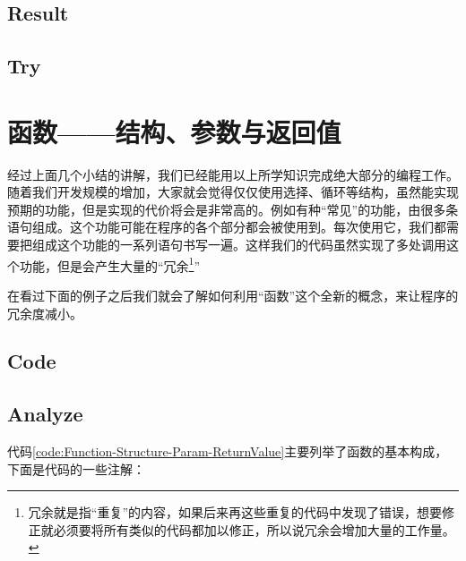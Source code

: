 \subsection{Result}

\subsection{Try}
































\section{函数——结构、参数与返回值}

经过上面几个小结的讲解，我们已经能用以上所学知识完成绝大部分的编程工作。随着我们开发规模的增加，大家就会觉得仅仅使用选择、循环等结构，虽然能实现预期的功能，但是实现的代价将会是非常高的。例如有种“常见”的功能，由很多条语句组成。这个功能可能在程序的各个部分都会被使用到。每次使用它，我们都需要把组成这个功能的一系列语句书写一遍。这样我们的代码虽然实现了多处调用这个功能，但是会产生大量的“冗余\footnote{冗余就是指“重复”的内容，如果后来再这些重复的代码中发现了错误，想要修正就必须要将所有类似的代码都加以修正，所以说冗余会增加大量的工作量。}”

在看过下面的例子之后我们就会了解如何利用“函数”这个全新的概念，来让程序的冗余度减小。

\subsection{Code}


\subsection{Analyze}
代码\ref{code:Function-Structure-Param-ReturnValue}主要列举了函数的基本构成，下面是代码的一些注解：
\begin{quote}
\showremarks
\end{quote}


